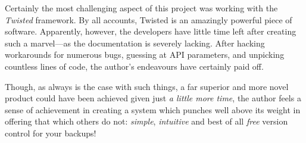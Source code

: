 Certainly the most challenging aspect of this project was working with the
\emph{Twisted} framework. By all accounts, Twisted is an amazingly powerful
piece of software. Apparently, however, the developers have little time left
after creating such a marvel---as the documentation is severely lacking. After
hacking workarounds for numerous bugs, guessing at API parameters, and
unpicking countless lines of code, the author's endeavours have certainly paid
off.

Though, as always is the case with such things, a far superior and more novel
product could have been achieved given just \emph{a little more time}, the
author feels a sense of achievement in creating a system which punches well
above its weight in offering that which others do not: \emph{simple},
\emph{intuitive} and best of all \emph{free} version control for your backups!


